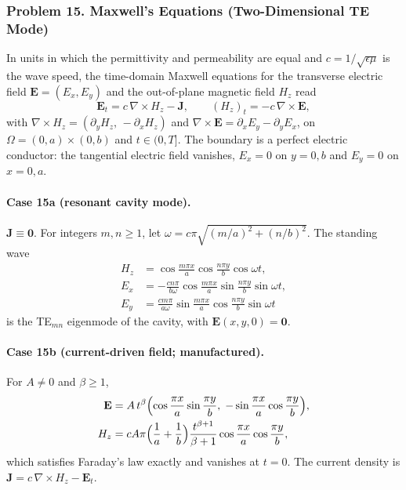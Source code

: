 \documentclass[11pt]{article}
\begin{document}
\subsubsection*{Problem 15. Maxwell's Equations (Two-Dimensional TE Mode)}

In units in which the permittivity and permeability are equal and
$c=1/\sqrt{\epsilon\mu}$ is the wave speed, the time-domain Maxwell
equations for the transverse electric field
$\mathbf{E}=(E_x,E_y)$ and the out-of-plane magnetic field $H_z$ read
\cite{Jac99,Yee66}
\[
\boxed{
\mathbf{E}_t=c\,\nabla\times H_z-\mathbf{J},
\qquad
(H_z)_t=-c\,\nabla\times\mathbf{E}
},
\]
with $\nabla\times H_z=(\partial_yH_z,\,-\partial_xH_z)$ and
$\nabla\times\mathbf{E}=\partial_xE_y-\partial_yE_x$, on
$\Omega=(0,a)\times(0,b)$ and $t\in(0,T]$. The boundary is a perfect
electric conductor: the tangential electric field vanishes,
$E_x=0$ on $y=0,b$ and $E_y=0$ on $x=0,a$.

\paragraph{Case 15a (resonant cavity mode).}
$\mathbf{J}\equiv\mathbf{0}$. For integers $m,n\ge1$, let
$\omega=c\pi\sqrt{(m/a)^2+(n/b)^2}$. The standing wave
\[
\begin{aligned}
H_z&=\cos\frac{m\pi x}{a}\cos\frac{n\pi y}{b}\cos\omega t,\\
E_x&=-\frac{cn\pi}{b\omega}\cos\frac{m\pi x}{a}\sin\frac{n\pi y}{b}\sin\omega t,\\
E_y&=\frac{cm\pi}{a\omega}\sin\frac{m\pi x}{a}\cos\frac{n\pi y}{b}\sin\omega t
\end{aligned}
\]
is the TE$_{mn}$ eigenmode of the cavity, with $\mathbf{E}(x,y,0)=\mathbf{0}$.

\paragraph{Case 15b (current-driven field; manufactured).}
For $A\neq0$ and $\beta\ge1$,
\[
\begin{aligned}
\mathbf{E}&=A\,t^\beta\Bigl(\cos\frac{\pi x}{a}\sin\frac{\pi y}{b},\;
-\sin\frac{\pi x}{a}\cos\frac{\pi y}{b}\Bigr),\\
H_z&=cA\pi\Bigl(\frac1a+\frac1b\Bigr)\frac{t^{\beta+1}}{\beta+1}
\cos\frac{\pi x}{a}\cos\frac{\pi y}{b},
\end{aligned}
\]
which satisfies Faraday's law exactly and vanishes at $t=0$. The current
density is $\mathbf{J}=c\,\nabla\times H_z-\mathbf{E}_t$.
\end{document}
